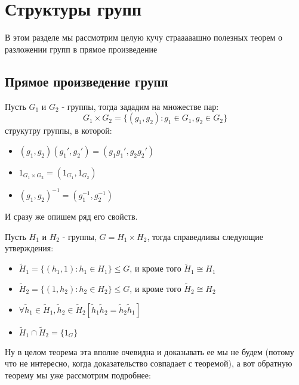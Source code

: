 \chapter{Структуры групп}

В этом разделе мы рассмотрим целую кучу страаааашно полезных теорем о разложении групп в прямое произведение

\section{Прямое произведение групп}

\begin{Def}
Пусть $G_1$ и $G_2$ - группы, тогда зададим на множестве пар:
\[
	G_1 \times G_2 = \{\left(g_1,g_2\right) : g_1 \in G_1, g_2 \in G_2\}
\]
струкутру группы, в которой:
\begin{itemize}
\item $\left(g_1, g_2\right) \left(g_1', g_2'\right) = \left(g_1g_1', g_2g_2'\right)$

\item $1_{G_1 \times G_2} = \left(1_{G_1}, 1_{G_2}\right)$

\item $\left(g_1, g_2\right)^{-1} = \left(g_1^{-1}, g_2^{-1}\right)$
\end{itemize}
\end{Def}

И сразу же опишем ряд его свойств.

\begin{Th}
Пусть $H_1$ и $H_2$ - группы, $G = H_1 \times H_2$, тогда справедливы следующие утверждения:
\begin{itemize}
\item $\tilde H_1 = \{\left(h_1, 1\right) : h_1 \in H_1\} \le G$, и кроме того $\tilde H_1 \cong H_1$

\item $\tilde H_2 = \{\left(1, h_2\right) : h_2 \in H_2\} \le G$, и кроме того $\tilde H_2 \cong H_2$

\item $\forall \tilde h_1 \in \tilde H_1, \tilde h_2 \in \tilde H_2 \left[\tilde h_1 \tilde h_2 = \tilde h_2 \tilde h_1\right]$

\item $\tilde H_1 \cap \tilde H_2 = \{1_G\}$
\end{itemize}
\end{Th}

Ну в целом теорема эта вполне очевидна и доказывать ее мы не будем (потому что не интересно, когда доказательство совпадает с теоремой), а вот обратную теорему мы уже рассмотрим подробнее:

